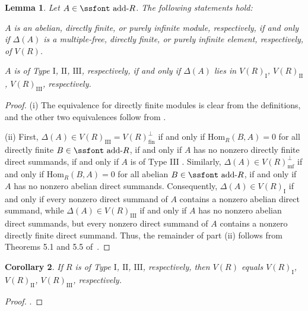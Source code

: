 \documentclass[psamsfonts,reqno]{memo-l}
\theoremstyle{plain}
\newtheorem{lemma}{Lemma}[section]
\newtheorem{corollary}[lemma]{Corollary}
\theoremstyle{definition}
\theoremstyle{remark}
\numberwithin{equation}{section}
\newcommand{\fin}{\mathrm{fin}}
\newcommand{\mf}{\mathrm{mf}}
\newcommand{\I}{\mathrm{I}}
\newcommand{\II}{\mathrm{II}}
\newcommand{\III}{\mathrm{III}}
\newcommand{\addR}{\mbox{\ssfont add-}R}
\newcommand{\Hom}{\mathrm{Hom}}
\begin{document}
\begin{lemma}\label{L:typeV(R)}
Let $A\in\addR$. The following statements hold:
\enumerate
\item $A$ is an abelian, directly finite, or purely
infinite module, respectively, if and only if $\Delta(A)$ is a
multiple-free, directly finite, or purely infinite
element, respectively, of $V(R)$.
\item $A$ is of Type $\I$, $\II$, $\III$, respectively, if and only if
$\Delta(A)$ lies in $V(R)_{\I}$, $V(R)_{\II}$,
$V(R)_{\III}$, respectively.
\endenumerate
\end{lemma}

\begin{proof} (i) The equivalence for directly finite
modules is clear from the definitions, and the other two equivalences follow
from \cite[Theorems 2.1, 6.2]{GoBo}.
%

(ii) First, $\Delta(A)\in V(R)_{\III}=V(R)_{\fin}^\perp$
 if and only if
$\Hom_R(B,A)=0$ for all directly finite $B\in
\addR$, if and only if $A$ has no nonzero directly
finite direct summands, if and only if $A$ is of Type III
\cite[p.~37]{GoBo}.
Similarly, $\Delta(A)\in V(R)_{\mf}^\perp$ if and only if $\Hom_R(B,A)=0$ for
all abelian $B\in \addR$, if and only if $A$ has no nonzero
abelian direct summands. Consequently, $\Delta(A)\in V(R)_{\I}$ if
and only if every nonzero direct summand of $A$ contains a nonzero
abelian direct summand, while $\Delta(A)\in V(R)_{\III}$ if and
only if $A$ has no nonzero abelian direct summands, but every
nonzero direct summand of $A$ contains a nonzero directly finite direct summand. Thus, the remainder of part (ii) follows from
Theorems 5.1 and 5.5 of~\cite{GoBo}.
\end{proof}

\begin{corollary}\label{C:typeV(R)}
If $R$ is of Type $\I$, $\II$, $\III$, respectively, then
$V(R)$ equals
$V(R)_{\I}$, $V(R)_{\II}$, $V(R)_{\III}$,
respectively.
\end{corollary}

\begin{proof}
\cite[Theorem~5.11]{GoBo}.
%
\end{proof}
\end{document}
